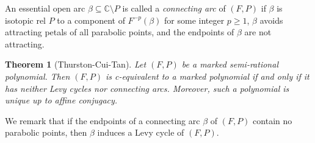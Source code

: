 \documentclass[a4paper,reqno,times, 11pt]{amsart}
\newtheorem{theorem}{Theorem}[section]
\theoremstyle{remark}
\theoremstyle{plain}
\numberwithin{equation}{section}
\def\C{\mbox{$\mathbb C$}}
\begin{document}
An essential open arc $\beta\subseteq\C\setminus P$ is called a \emph{connecting arc} of $(F,P)$ if $\beta$ is isotopic rel $P$ to a component of $F^{-p}(\beta)$ for some integer $p\geq1$, $\beta$ avoids attracting petals of all parabolic points, and the endpoints of $\beta$ are not attracting.
		
		\begin{theorem}[Thurston-Cui-Tan\cite{DH3,CT2}]\label{thm:cui-tan-Thurston}
			Let $(F,P)$ be a marked semi-rational polynomial. Then $(F,P)$ is c-equivalent to a marked polynomial if and only if it has neither Levy cycles nor connecting arcs. Moreover, such a polynomial is unique up to affine conjugacy.
		\end{theorem}
		
We remark that if the endpoints of a connecting arc $\beta$ of $(F,P)$ contain no parabolic points, then $\beta$ induces a Levy cycle of $(F,P)$.	
		
\end{document}
